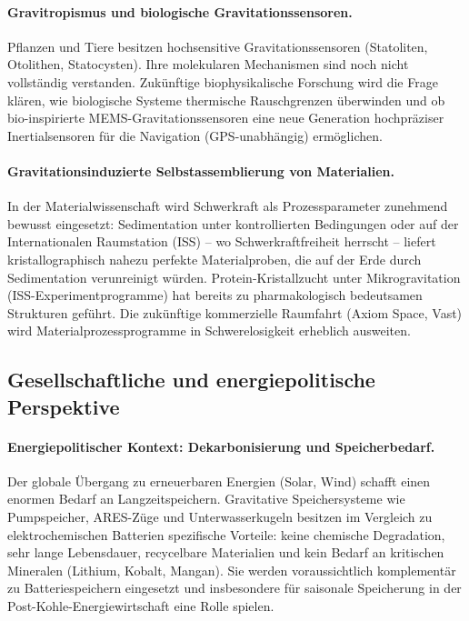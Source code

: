 ﻿\documentclass[12pt, a4paper]{report}
\theoremstyle{definition}
\theoremstyle{remark}
\begin{document}
\paragraph{Gravitropismus und biologische Gravitationssensoren.}
Pflanzen und Tiere besitzen hochsensitive Gravitationssensoren (Statoliten,
Otolithen, Statocysten). Ihre molekularen Mechanismen sind noch nicht vollständig
verstanden. Zukünftige biophysikalische Forschung wird die Frage klären, wie
biologische Systeme thermische Rauschgrenzen überwinden und ob bio-inspirierte
MEMS-Gravitationssensoren eine neue Generation hochpräziser Inertialsensoren
für die Navigation (GPS-unabhängig) ermöglichen.

\paragraph{Gravitationsinduzierte Selbstassemblierung von Materialien.}
In der Materialwissenschaft wird Schwerkraft als Prozessparameter zunehmend
bewusst eingesetzt: Sedimentation unter kontrollierten Bedingungen oder auf
der Internationalen Raumstation (ISS) -- wo Schwerkraftfreiheit herrscht --
liefert kristallographisch nahezu perfekte Materialproben, die auf der Erde
durch Sedimentation verunreinigt würden. Protein-Kristallzucht unter Mikrogravitation
(ISS-Experimentprogramme) hat bereits zu pharmakologisch bedeutsamen Strukturen
geführt. Die zukünftige kommerzielle Raumfahrt (Axiom Space, Vast) wird
Materialprozessprogramme in Schwerelosigkeit erheblich ausweiten.

\subsection{Gesellschaftliche und energiepolitische Perspektive}

\paragraph{Energiepolitischer Kontext: Dekarbonisierung und Speicherbedarf.}
Der globale Übergang zu erneuerbaren Energien (Solar, Wind) schafft einen
enormen Bedarf an Langzeitspeichern. Gravitative Speichersysteme wie
Pumpspeicher, ARES-Züge und Unterwasserkugeln besitzen im Vergleich zu
elektrochemischen Batterien spezifische Vorteile: keine chemische Degradation,
sehr lange Lebensdauer, recycelbare Materialien und kein Bedarf an kritischen
Mineralen (Lithium, Kobalt, Mangan). Sie werden voraussichtlich komplementär
zu Batteriespeichern eingesetzt und insbesondere für saisonale Speicherung
in der Post-Kohle-Energiewirtschaft eine Rolle spielen.
\end{document}

